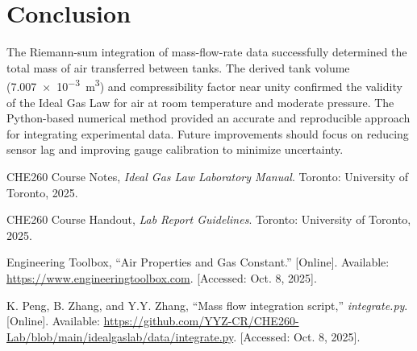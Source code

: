 \documentclass[12pt]{article}
\begin{document}
\section*{Conclusion}
The Riemann-sum integration of mass-flow-rate data successfully determined the total mass of air transferred between tanks. The derived tank volume (\SI{7.007e-3}{\metre\cubed}) and compressibility factor near unity confirmed the validity of the Ideal Gas Law for air at room temperature and moderate pressure. The Python-based numerical method provided an accurate and reproducible approach for integrating experimental data. Future improvements should focus on reducing sensor lag and improving gauge calibration to minimize uncertainty.

\begin{thebibliography}{9}
CHE260 Course Notes, \textit{Ideal Gas Law Laboratory Manual}. Toronto: University of Toronto, 2025.

CHE260 Course Handout, \textit{Lab Report Guidelines}. Toronto: University of Toronto, 2025.

Engineering Toolbox, ``Air Properties and Gas Constant.'' [Online]. Available: \url{https://www.engineeringtoolbox.com}. [Accessed: Oct. 8, 2025].

K. Peng, B. Zhang, and Y.Y. Zhang, ``Mass flow integration script,'' \textit{integrate.py}. [Online]. Available: \url{https://github.com/YYZ-CR/CHE260-Lab/blob/main/idealgaslab/data/integrate.py}. [Accessed: Oct. 8, 2025].
\end{thebibliography}
\end{document}
